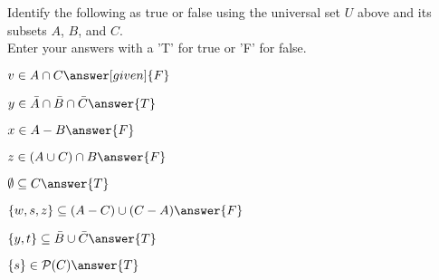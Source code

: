 \documentclass{ximera}
\begin{document}
\begin{question}
Identify the following as true or false using the universal set $U$ above and its subsets $A$, $B$, and $C$. \\ Enter your answers with a 'T' for true or 'F' for false.
\begin{prompt}
    \begin{enumerate}
    \begin{multicols}{2}

        \item $v \in A \cap C  \answer[given]{F}$
			
			\item $y \in \bar{A} \cap \bar{B} \cap \bar{C}  \answer{T}$
			
			\item $x \in A - B \answer{F} $
			
			\item $z \in (A \cup C) \cap B  \answer{F}$
			
			\item $\emptyset \subseteq C \answer{T}$
			
			\item $\{w, s, z\} \subseteq (A - C) \cup (C - A) \answer{F}$
			
			\item $\{y,t\} \subseteq \bar{B} \cup \bar{C} \answer{T}$
			
			\item $\{s\} \in \mathcal{P}(C) \answer{T}$
    \end{multicols}
    \end{enumerate}
\end{prompt}
\end{question}
\end{document}
